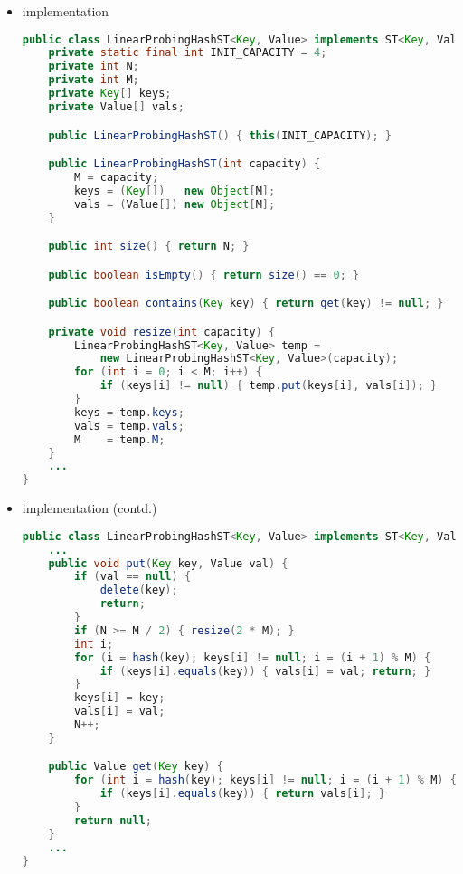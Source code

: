 \documentclass[8pt,a4paper,compress]{beamer}
\begin{document}
\begin{frame}[fragile]
\begin{itemize}
\item implementation
\begin{lstlisting}[language=Java]
public class LinearProbingHashST<Key, Value> implements ST<Key, Value> {
    private static final int INIT_CAPACITY = 4;
    private int N; 
    private int M; 
    private Key[] keys; 
    private Value[] vals; 

    public LinearProbingHashST() { this(INIT_CAPACITY); }

    public LinearProbingHashST(int capacity) {
        M = capacity;
        keys = (Key[])   new Object[M];
        vals = (Value[]) new Object[M];
    }

    public int size() { return N; }

    public boolean isEmpty() { return size() == 0; }

    public boolean contains(Key key) { return get(key) != null; }

    private void resize(int capacity) {
        LinearProbingHashST<Key, Value> temp = 
            new LinearProbingHashST<Key, Value>(capacity);
        for (int i = 0; i < M; i++) {
            if (keys[i] != null) { temp.put(keys[i], vals[i]); }
        }
        keys = temp.keys;
        vals = temp.vals;
        M    = temp.M;
    }
    ...
}
\end{lstlisting}
\end{itemize}
\end{frame}

\begin{frame}[fragile]
\begin{itemize}
\item implementation (contd.)
\begin{lstlisting}[language=Java]
public class LinearProbingHashST<Key, Value> implements ST<Key, Value> {
    ...
    public void put(Key key, Value val) {
        if (val == null) {
            delete(key);
            return;
        }
        if (N >= M / 2) { resize(2 * M); }
        int i;
        for (i = hash(key); keys[i] != null; i = (i + 1) % M) {
            if (keys[i].equals(key)) { vals[i] = val; return; }
        }
        keys[i] = key;
        vals[i] = val;
        N++;
    }

    public Value get(Key key) {
        for (int i = hash(key); keys[i] != null; i = (i + 1) % M) {
            if (keys[i].equals(key)) { return vals[i]; }
        }
        return null;
    }
    ...
}
\end{lstlisting}
\end{itemize}
\end{frame}
\end{document}
